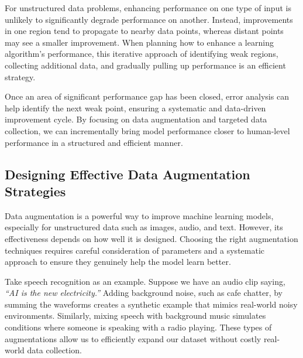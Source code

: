 \documentclass[12pt,openany, draft]{book}
\begin{document}
For unstructured data problems, enhancing performance on one type of input is unlikely to significantly degrade performance on another. Instead, improvements in one region tend to propagate to nearby data points, whereas distant points may see a smaller improvement. When planning how to enhance a learning algorithm’s performance, this iterative approach of identifying weak regions, collecting additional data, and gradually pulling up performance is an efficient strategy. 
\newline

Once an area of significant performance gap has been closed, error analysis can help identify the next weak point, ensuring a systematic and data-driven improvement cycle. By focusing on data augmentation and targeted data collection, we can incrementally bring model performance closer to human-level performance in a structured and efficient manner.


\subsection{Designing Effective Data Augmentation Strategies}

Data augmentation is a powerful way to improve machine learning models, especially for unstructured data such as images, audio, and text. However, its effectiveness depends on how well it is designed. Choosing the right augmentation techniques requires careful consideration of parameters and a systematic approach to ensure they genuinely help the model learn better. \newline

Take speech recognition as an example. Suppose we have an audio clip saying, \textit{``AI is the new electricity.''} Adding background noise, such as cafe chatter, by summing the waveforms creates a synthetic example that mimics real-world noisy environments. Similarly, mixing speech with background music simulates conditions where someone is speaking with a radio playing. These types of augmentations allow us to efficiently expand our dataset without costly real-world data collection.
\end{document}
